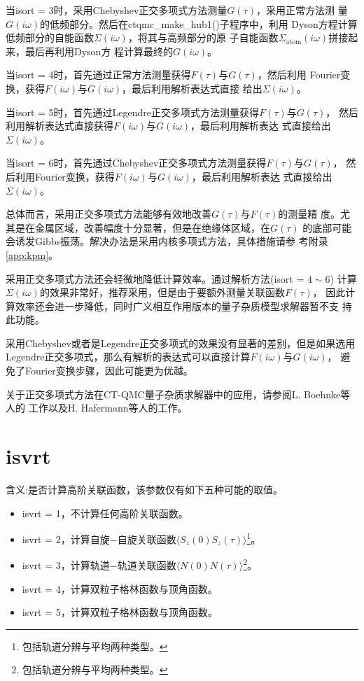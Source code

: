 当isort = 3时，采用Chebyshev正交多项式方法测量$G(\tau)$，采用正常方法测
量$G(i\omega)$的低频部分。然后在ctqmc\_make\_hub1()子程序中，利用
Dyson方程计算低频部分的自能函数$\Sigma(i\omega)$，将其与高频部分的原
子自能函数$\Sigma_{\text{atom}}(i\omega)$拼接起来，最后再利用Dyson方
程计算最终的$G(i\omega)$。

当isort = 4时，首先通过正常方法测量获得$F(\tau)$与$G(\tau)$，然后利用
Fourier变换，获得$F(i\omega)$与$G(i\omega)$，最后利用解析表达式直接
给出$\Sigma(i\omega)$。

当isort = 5时，首先通过Legendre正交多项式方法测量获得$F(\tau)$与$G(\tau)$，
然后利用解析表达式直接获得$F(i\omega)$与$G(i\omega)$，最后利用解析表达
式直接给出$\Sigma(i\omega)$。

当isort = 6时，首先通过Chebyshev正交多项式方法测量获得$F(\tau)$与$G(\tau)$，
然后利用Fourier变换，获得$F(i\omega)$与$G(i\omega)$，最后利用解析表达
式直接给出$\Sigma(i\omega)$。

总体而言，采用正交多项式方法能够有效地改善$G(\tau)$与$F(\tau)$的测量精
度。尤其是在金属区域，改善幅度十分显著，但是在绝缘体区域，在$G(\tau)$
的底部可能会诱发Gibbs振荡。解决办法是采用内核多项式方法，具体措施请参
考附录\ref{app:kpm}。

采用正交多项式方法还会轻微地降低计算效率。通过解析方法(isort = $4 \sim 6$)
计算$\Sigma(i\omega)$的效果非常好，推荐采用，但是由于要额外测量关联函数$F(\tau)$，
因此计算效率还会进一步降低，同时广义相互作用版本的量子杂质模型求解器暂不支
持此功能。

采用Chebyshev或者是Legendre正交多项式的效果没有显著的差别，但是如果选用
Legendre正交多项式，那么有解析的表达式可以直接计算$F(i\omega)$与$G(i\omega)$，
避免了Fourier变换步骤，因此可能更为优越。

关于正交多项式方法在CT-QMC量子杂质求解器中的应用，请参阅L. Boehnke等人的
工作\cite{ortho:075145}以及H. Hafermann等人的工作\cite{hh:2011}。

\section{isvrt }
\label{sec:isvrt}

{\color{red}含义}:是否计算高阶关联函数，该参数仅有如下五种可能的取值。
\begin{itemize}
\item isvrt = 1，不计算任何高阶关联函数。
\item isvrt = 2，计算自旋$-$自旋关联函数$\langle S_{z}(0) S_{z}(\tau) \rangle$\footnote{包括轨道分辨与平均两种类型。}。
\item isvrt = 3，计算轨道$-$轨道关联函数$\langle N(0) N(\tau) \rangle$\footnote{包括轨道分辨与平均两种类型。}。
\item isvrt = 4，计算双粒子格林函数与顶角函数。
\item isvrt = 5，计算双粒子格林函数与顶角函数。
\end{itemize}

